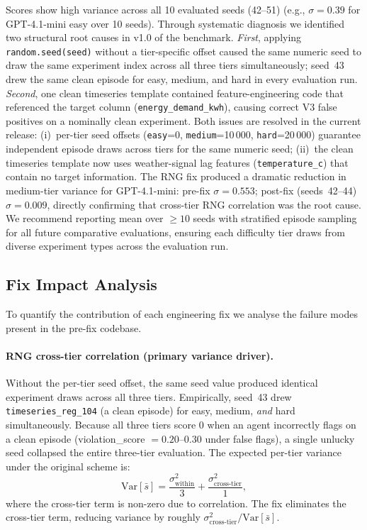\documentclass{article}
\begin{document}
Scores show high variance across all 10 evaluated seeds (42--51)
(e.g., $\sigma=0.39$ for GPT-4.1-mini easy over 10 seeds).
Through systematic diagnosis we identified two structural root causes in v1.0 of the benchmark.
\textit{First}, applying \texttt{random.seed(seed)} without a tier-specific offset caused the
same numeric seed to draw the same experiment index across all three tiers simultaneously;
seed~43 drew the same clean episode for easy, medium, and hard in every evaluation run.
\textit{Second}, one clean timeseries template contained feature-engineering code that
referenced the target column (\texttt{energy\_demand\_kwh}), causing correct V3 false positives
on a nominally clean experiment.  Both issues are resolved in the current release:
(i)~per-tier seed offsets (\texttt{easy}=0, \texttt{medium}=10\,000, \texttt{hard}=20\,000)
guarantee independent episode draws across tiers for the same numeric seed;
(ii)~the clean timeseries template now uses weather-signal lag features (\texttt{temperature\_c})
that contain no target information.
The RNG fix produced a dramatic reduction in medium-tier variance for GPT-4.1-mini:
pre-fix $\sigma=0.553$; post-fix (seeds~42--44) $\sigma=0.009$, directly confirming
that cross-tier RNG correlation was the root cause.
We recommend reporting mean over $\geq10$ seeds with stratified episode sampling for
all future comparative evaluations, ensuring each difficulty tier draws from
diverse experiment types across the evaluation run.

\subsection{Fix Impact Analysis}
\label{sec:ablation}

To quantify the contribution of each engineering fix we analyse the
failure modes present in the pre-fix codebase.

\paragraph{RNG cross-tier correlation (primary variance driver).}
Without the per-tier seed offset, the same seed value produced
identical experiment draws across all three tiers.
Empirically, seed~43 drew \texttt{timeseries\_reg\_104} (a clean episode)
for easy, medium, \emph{and} hard simultaneously.
Because all three tiers score 0 when an agent incorrectly flags on a clean
episode (violation\_score $= 0.20$--$0.30$ under false flags), a single
unlucky seed collapsed the entire three-tier evaluation.
The expected per-tier variance under the original scheme is:
\begin{equation*}
  \mathrm{Var}[\bar{s}] = \frac{\sigma_\text{within}^2}{3} + \frac{\sigma_\text{cross-tier}^2}{1},
\end{equation*}
where the cross-tier term is non-zero due to correlation.
The fix eliminates the cross-tier term, reducing variance by roughly
$\sigma_\text{cross-tier}^2 / \mathrm{Var}[\bar{s}]$.
\end{document}
